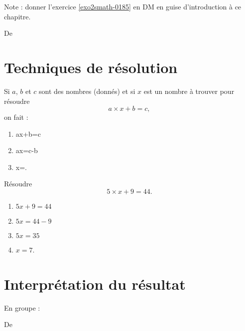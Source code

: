 
Note : donner l'exercice \ref{exo2smath-0185} en DM en guise d'introduction à ce chapitre.


De \cite{NRHooXFvgpp4}

\section{Techniques de résolution}

Si \( a\), \( b\) et \( c\) sont des nombres (donnés) et si \( x\) est un nombre à trouver pour résoudre
\begin{equation}
    a\times x+b=c,
\end{equation}
on fait :
\begin{enumerate}
    \item
        ax+b=c
    \item
        ax=c-b
    \item
        x=.
\end{enumerate}

\begin{example}
    Résoudre
    \begin{equation}
        5\times x+9=44.
    \end{equation}
    \begin{enumerate}
        \item
            \( 5x+9=44\)
        \item
            \( 5x=44-9\)
        \item
             \( 5x=35\)
         \item
             \( x=7\).
    \end{enumerate}
\end{example}

\section{Interprétation du résultat}

En groupe :

De \cite{NRHooXFvgpp4}



